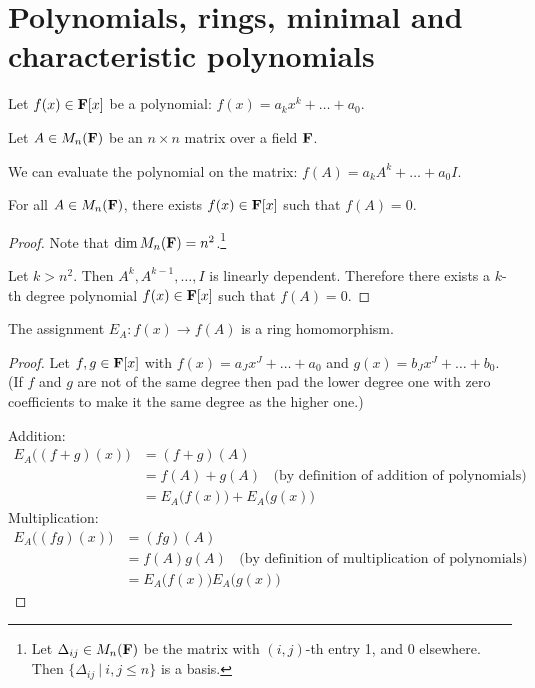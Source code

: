 \newpage
\section{Polynomials, rings, minimal and characteristic polynomials}

Let $f(x) \in \mathbf{F}[x]$ be a polynomial: $f(x) = a_kx^k + \ldots + a_0$.

Let $A \in M_n(\mathbf{F})$ be an $n \times n$ matrix over a field $\mathbf{F}$.

We can evaluate the polynomial on the matrix: $f(A) = a_kA^k + \ldots + a_0I$.

\begin{theorem*}
  For all $A \in M_n(\mathbf{F})$, there exists $f(x) \in \mathbf{F}[x]$ such that $f(A) = 0$.
\end{theorem*}

\begin{proof}
  Note that $\dim M_n(\mathbf{F}) = n^2$.\footnote{Let $\Delta_{ij} \in M_n(\mathbf{F})$ be the matrix with $(i,j)$-th entry 1, and 0
    elsewhere. Then $\{\Delta_{ij} ~|~ i,j \leq n\}$ is a basis.}

  Let $k > n^2$. Then $A^k, A^{k-1}, \ldots, I$ is linearly dependent. Therefore there exists a
  $k$-th degree polynomial $f(x) \in \mathbf{F}[x]$ such that $f(A) = 0$.
\end{proof}

\begin{theorem*}
  The assignment $E_A: f(x) \to f(A)$ is a ring homomorphism.
\end{theorem*}


\begin{proof}
  Let $f, g \in \mathbf{F}[x]$ with $f(x) = a_Jx^J + \ldots + a_0$ and $g(x) = b_Jx^J + \ldots + b_0$. (If
  $f$ and $g$ are not of the same degree then pad the lower degree one with zero coefficients to
  make it the same degree as the higher one.)

  Addition:
  \begin{align*}
    E_A\Big((f + g)(x)\Big) &= (f + g)(A)\\
                            &= f(A) + g(A)~~~~\text{(by definition of addition of polynomials)}\\
                            &= E_A\Big(f(x)\Big) + E_A\Big(g(x)\Big)
  \end{align*}
  Multiplication:
  \begin{align*}
    E_A\Big((fg)(x)\Big)    &= (fg)(A)\\
                            &= f(A)g(A)~~~~\text{(by definition of multiplication of polynomials)}\\
                            &= E_A\Big(f(x)\Big)E_A\Big(g(x)\Big)
  \end{align*}
\end{proof}

